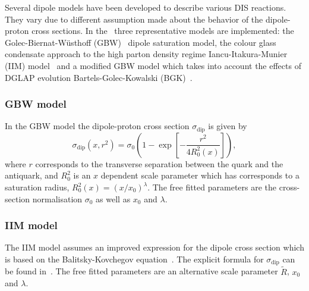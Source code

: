 
Several dipole models have been developed to describe various DIS reactions. 
They vary due to different assumption made about the behavior of the dipole-proton cross sections.   
In the \fitter\  three representative models  are implemented:
the Golec-Biernat-W\"usthoff (GBW)~\cite{Golec-Biernat:1998js} 
dipole saturation model,
the colour glass condensate approach to the high parton density 
regime Iancu-Itakura-Munier (IIM) model~\cite{Iancu:2003ge} and 
a modified GBW model which takes into account the effects of  
DGLAP evolution Bartels-Golec-Kowalski (BGK)~\cite{Bartels:2002cj}.

\subsubsection{GBW model}

In the GBW model the dipole-proton cross section $\sigma_{\text{dip}}$ is given by
\begin{equation}
\label{eGBW}
   \sigma_{\text{dip}}(x,r^{2}) = \sigma_{0} \left(1 - \exp \left[-\frac{r^{2}}{4R_{0}^{2}(x)} \right]\right),
\end{equation}
where $r$ corresponds to the transverse separation between the quark and the antiquark, and $R_{0}^{2}$
 is 
an $x$ dependent scale parameter which has corresponds to a saturation radius,  $R_{0}^{2}(x)=\left(x/x_{0}\right)^{\lambda}$.
The free fitted parameters are the cross-section normalisation $\sigma_{0}$ as well as $x_{0}$ and $\lambda$.

\subsubsection{IIM model}

The IIM model assumes an improved expression for the dipole cross section which is based on the 
Balitsky-Kovchegov equation~\cite{Balitsky:1995ub}. The explicit formula for $\sigma_{\text{dip}}$ 
can be found in~\cite{Iancu:2003ge}. The free fitted parameters are an alternative scale parameter $\tilde{R}$, $x_{0}$ and $\lambda$.

